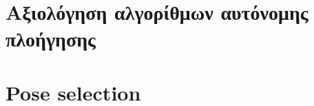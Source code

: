 \chapter{Αξιολόγηση αλγορίθμων αυτόνομης πλοήγησης}
  \label{appendix:01}
  

\chapter{Pose selection}
  \label{appendix:02}
  

